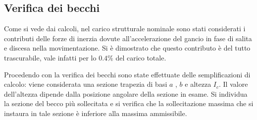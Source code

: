 \subsection{Verifica dei becchi}
Come si vede dai calcoli, nel carico strutturale nominale sono stati considerati i contributi delle forze di inerzia dovute all'accelerazione del gancio in fase di salita e discesa nella movimentazione. Si è dimostrato che questo contributo è del tutto trascurabile, vale infatti per lo $0.4\%$ del carico totale. 

Procedendo con la verifica dei becchi sono state effettuate delle semplificazioni di calcolo: viene considerata una sezione trapezia di basi $a$ , $b$ e altezza $I_c$. Il valore dell'altezza dipende dalla posizione angolare della sezione in esame. Si individua la sezione del becco più sollecitata e si verifica che la sollecitazione massima che si instaura in tale sezione è inferiore alla massima ammissibile.

